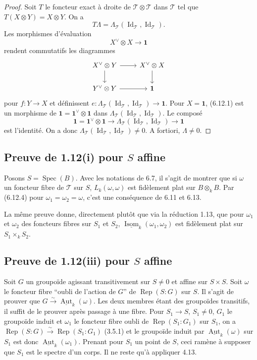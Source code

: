 \documentclass[12pt,a4paper]{article}
\theoremstyle{plain}
\theoremstyle{definition}
\DeclareMathOperator{\Spec}{Spec}
\DeclareMathOperator{\Aut}{Aut}
\DeclareMathOperator{\Isom}{Isom}
\DeclareMathOperator{\Rep}{Rep}
\DeclareMathOperator{\Id}{Id}
\begin{document}
\begin{proof}
Soit $T$ le foncteur exact à droite de $\mathcal{T} \otimes \mathcal{T}$ dans $\mathcal{T}$ tel que $T(X \otimes Y) = X \otimes Y$. On a
\[
T\Lambda = \Lambda_\mathcal{T}(\Id_\mathcal{T}, \Id_\mathcal{T}).
\]
Les morphismes d'évaluation
\[
X^\vee \otimes X \to \mathbf{1}
\]
rendent commutatifs les diagrammes
\[
\begin{tikzcd}
X^\vee \otimes Y \arrow[r] \arrow[d] & X^\vee \otimes X \arrow[d] \\
Y^\vee \otimes Y \arrow[r] & \mathbf{1}
\end{tikzcd}
\]
pour $f : Y \to X$ et définissent $e : \Lambda_\mathcal{T}(\Id_\mathcal{T}, \Id_\mathcal{T}) \to \mathbf{1}$. Pour $X = \mathbf{1}$, (6.12.1) est un morphisme de $\mathbf{1} = \mathbf{1}^\vee \otimes \mathbf{1}$ dans $\Lambda_\mathcal{T}(\Id_\mathcal{T}, \Id_\mathcal{T})$. Le composé
\[
\mathbf{1} = \mathbf{1}^\vee \otimes \mathbf{1} \to \Lambda_\mathcal{T}(\Id_\mathcal{T}, \Id_\mathcal{T}) \to \mathbf{1}
\]
est l'identité. On a donc $\Lambda_\mathcal{T}(\Id_\mathcal{T}, \Id_\mathcal{T}) \neq 0$. A fortiori, $\Lambda \neq 0$.
\end{proof}

\subsection{Preuve de 1.12(i) pour $S$ affine}

Posons $S = \Spec(B)$. Avec les notations de 6.7, il s'agit de montrer que si $\omega$ un foncteur fibre de $\mathcal{T}$ sur $S$, $L_k(\omega, \omega)$ est fidèlement plat sur $B \otimes_k B$. Par (6.12.4) pour $\omega_1 = \omega_2 = \omega$, c'est une conséquence de 6.11 et 6.13.

La même preuve donne, directement plutôt que via la réduction 1.13, que pour $\omega_1$ et $\omega_2$ des foncteurs fibres sur $S_1$ et $S_2$, $\underline{\Isom}_k(\omega_1, \omega_2)$ est fidèlement plat sur $S_1 \times_k S_2$.

\subsection{Preuve de 1.12(iii) pour $S$ affine}

Soit $G$ un groupoïde agissant transitivement sur $S \neq 0$ et affine sur $S \times S$. Soit $\omega$ le foncteur fibre ``oubli de l'action de $G$'' de $\Rep(S : G)$ sur $S$. Il s'agit de prouver que $G \xrightarrow{\sim} \underline{\Aut}_k(\omega)$. Les deux membres étant des groupoïdes transitifs, il suffit de le prouver après passage à une fibre. Pour $S_1 \to S$, $S_1 \neq 0$, $G_1$ le groupoïde induit et $\omega_1$ le foncteur fibre oubli de $\Rep(S_1 : G_1)$ sur $S_1$, on a $\Rep(S : G) \xrightarrow{\sim} \Rep(S_1 : G_1)$ (3.5.1) et le groupoïde induit par $\underline{\Aut}_k(\omega)$ sur $S_1$ est donc $\underline{\Aut}_k(\omega_1)$. Prenant pour $S_1$ un point de $S$, ceci ramène à supposer que $S_1$ est le spectre d'un corps. Il ne reste qu'à appliquer 4.13.
\end{document}
